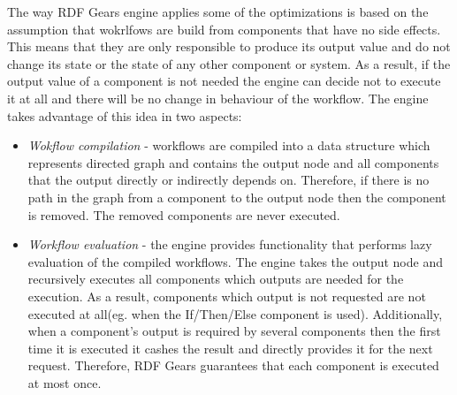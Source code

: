 The way RDF Gears engine applies some of the optimizations is based on the assumption that wokrlfows are build from components that have no side effects. This means that they are only responsible to produce its output value and do not change its state or the state of any other component or system. As a result, if the output value of a component is not needed the engine can decide not to execute it at all and there will be no change in behaviour of the workflow. The engine takes advantage of this idea in two aspects:
	\begin{itemize}
		\item \textit{Wokflow compilation} - workflows are compiled into a data structure which represents directed graph and contains the output node and all components that the output directly or indirectly depends on. Therefore, if there is no path in the graph from a component to the output node then the component is removed. The removed components are never executed.
		
		\item \textit{Workflow evaluation} - the engine provides functionality that performs lazy evaluation of the compiled workflows. The engine takes the output node and recursively executes all components which outputs are needed for the execution. As a result, components which output is not requested are not executed at all(eg. when the If/Then/Else component is used). Additionally, when a component's output is required by several components then the first time it is executed it cashes the result and directly provides it for the next request. Therefore, RDF Gears guarantees that each component is executed at most once.
	\end{itemize}
